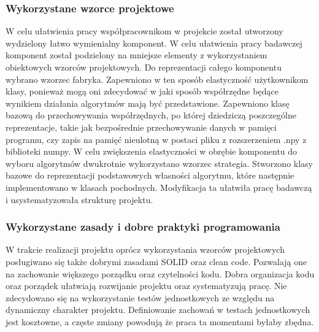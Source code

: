 \documentclass{article}
\begin{document}
\subsubsection{Wykorzystane wzorce projektowe}

W celu ułatwienia pracy współpracownikom w projekcie został utworzony wydzielony łatwo wymienialny komponent. W celu ułatwienia pracy badawczej komponent został podzielony na mniejsze elementy z wykorzystaniem obiektowych wzorców projektowych.
Do reprezentacji całego komponentu wybrano wzorzec fabryka. Zapewniono w ten sposób elastyczność użytkownikom klasy, ponieważ mogą oni zdecydować w jaki sposób współrzędne będące wynikiem działania algorytmów mają być przedstawione. Zapewniono klasę bazową do przechowywania współrzędnych, po której dziedziczą poszczególne reprezentacje, takie jak bezpośrednie przechowywanie danych w pamięci programu, czy zapis na pamięć nieulotną w postaci pliku z rozszerzeniem .npy z biblioteki numpy.
W celu zwiększenia elastyczności w obrębie komponentu do wyboru algorytmów dwukrotnie wykorzystano wzorzec strategia. Stworzono klasy bazowe do reprezentacji podstawowych własności algorytmu, które następnie implementowano w klasach pochodnych. Modyfikacja ta ułatwiła pracę badawczą i usystematyzowała strukturę projektu.
\subsubsection{Wykorzystane zasady i dobre praktyki programowania}

W trakcie realizacji projektu oprócz wykorzystania wzorców projektowych posługiwano się także dobrymi zasadami SOLID oraz clean code. Pozwalają one na zachowanie większego porządku oraz czytelności kodu. Dobra organizacja kodu oraz porządek ułatwiają rozwijanie projektu oraz systematyzują pracę. Nie zdecydowano się na wykorzystanie testów jednostkowych ze względu na dynamiczny charakter projektu. Definiowanie zachowań w testach jednostkowych jest kosztowne, a częste zmiany powodują że praca ta momentami byłaby zbędna.
\end{document}

